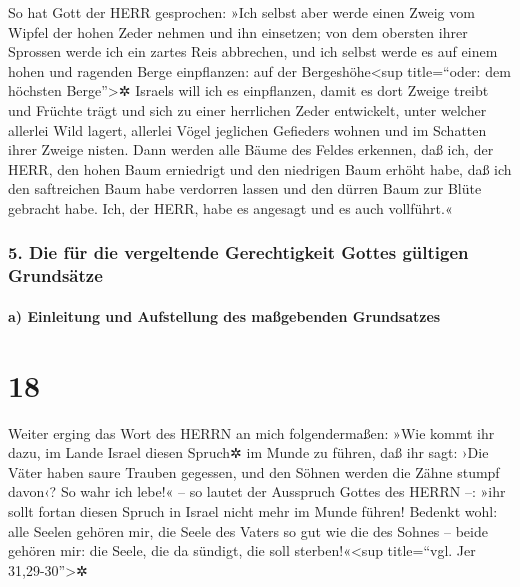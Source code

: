 So hat Gott der HERR gesprochen: »Ich selbst aber werde
einen Zweig vom Wipfel der hohen Zeder nehmen und ihn einsetzen; von dem
obersten ihrer Sprossen werde ich ein zartes Reis abbrechen, und ich
selbst werde es auf einem hohen und ragenden Berge einpflanzen:
auf der Bergeshöhe\textless sup title=``oder: dem
höchsten Berge''\textgreater✲ Israels will ich es einpflanzen, damit es
dort Zweige treibt und Früchte trägt und sich zu einer herrlichen Zeder
entwickelt, unter welcher allerlei Wild lagert, allerlei Vögel jeglichen
Gefieders wohnen und im Schatten ihrer Zweige nisten.
Dann werden alle Bäume des Feldes erkennen, daß ich, der
HERR, den hohen Baum erniedrigt und den niedrigen Baum erhöht habe, daß
ich den saftreichen Baum habe verdorren lassen und den dürren Baum zur
Blüte gebracht habe. Ich, der HERR, habe es angesagt und es auch
vollführt.«

\hypertarget{die-fuxfcr-die-vergeltende-gerechtigkeit-gottes-guxfcltigen-grundsuxe4tze}{%
\subsubsection{5. Die für die vergeltende Gerechtigkeit Gottes gültigen
Grundsätze}\label{die-fuxfcr-die-vergeltende-gerechtigkeit-gottes-guxfcltigen-grundsuxe4tze}}

\hypertarget{a-einleitung-und-aufstellung-des-mauxdfgebenden-grundsatzes}{%
\paragraph{a) Einleitung und Aufstellung des maßgebenden
Grundsatzes}\label{a-einleitung-und-aufstellung-des-mauxdfgebenden-grundsatzes}}

\hypertarget{section-17}{%
\section{18}\label{section-17}}

Weiter erging das Wort des HERRN an mich folgendermaßen:
»Wie kommt ihr dazu, im Lande Israel diesen Spruch✲ im
Munde zu führen, daß ihr sagt: ›Die Väter haben saure Trauben gegessen,
und den Söhnen werden die Zähne stumpf davon‹? So wahr ich
lebe!« -- so lautet der Ausspruch Gottes des HERRN --: »ihr sollt fortan
diesen Spruch in Israel nicht mehr im Munde führen!
Bedenkt wohl: alle Seelen gehören mir, die Seele des
Vaters so gut wie die des Sohnes -- beide gehören mir: die Seele, die da
sündigt, die soll sterben!«\textless sup title=``vgl. Jer
31,29-30''\textgreater✲

